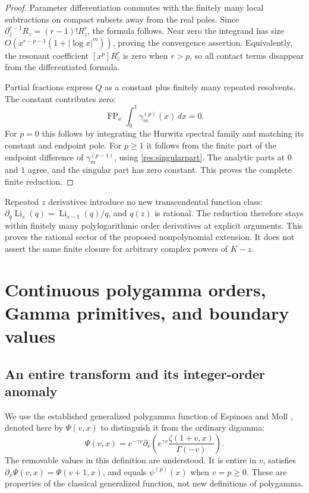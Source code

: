 \documentclass[11pt,a4paper]{article}
\numberwithin{equation}{section}
\theoremstyle{definition}
\theoremstyle{remark}
\DeclareMathOperator{\Li}{Li}
\begin{document}
\begin{proof}
Parameter differentiation commutes with the finitely many local
subtractions on compact subsets away from the real poles. Since
$\partial_z^{r-1}R_z=(r-1)!R_z^r$, the formula follows.
Near zero the integrand has size
$O(x^{r-p-1}(1+|\log x|^m))$, proving the convergence assertion.
Equivalently, the resonant coefficient $[x^p]R_z^r$ is zero
when $r>p$, so all contact terms disappear from the differentiated
formula.

Partial fractions express $Q$ as a constant plus finitely many
repeated resolvents. The constant contributes zero:
\[
 \operatorname{FP}_x\int_0^1\gamma_m^{(p)}(x)\,dx=0.
\]
For $p=0$ this follows by integrating the Hurwitz spectral family
and matching its constant and endpoint pole. For $p\ge1$ it
follows from the finite part of the endpoint difference of
$\gamma_m^{(p-1)}$, using \eqref{res:singularpart}. The analytic
parts at $0$ and $1$ agree, and the singular part has zero constant.
This proves the complete finite reduction.
\end{proof}

Repeated $z$ derivatives introduce no new transcendental function
class: $\partial_q\Li_s(q)=\Li_{s-1}(q)/q$, and $q(z)$ is rational.
The reduction therefore stays within finitely many polylogarithmic
order derivatives at explicit arguments. This proves the rational
sector of the proposed nonpolynomial extension. It does not assert
the same finite closure for arbitrary complex powers of $K-z$.

\section{Continuous polygamma orders, Gamma primitives, and boundary values}
\label{res:primitive-section}

\subsection{An entire transform and its integer-order anomaly}

We use the established generalized polygamma function of Espinosa
and Moll \cite{EM}, denoted here by $\Psi(v,x)$ to distinguish it
from the ordinary digamma:
\begin{equation}\label{res:EM}
 \Psi(v,x)=e^{-\gamma v}\partial_v
       \left(e^{\gamma v}\frac{\zeta(1+v,x)}{\Gamma(-v)}\right).
\end{equation}
The removable values in this definition are understood. It is entire
in $v$, satisfies $\partial_x\Psi(v,x)=\Psi(v+1,x)$, and equals
$\psi^{(p)}(x)$ when $v=p\ge0$. These are properties of the
classical generalized function, not new definitions of polygamma.
\end{document}

